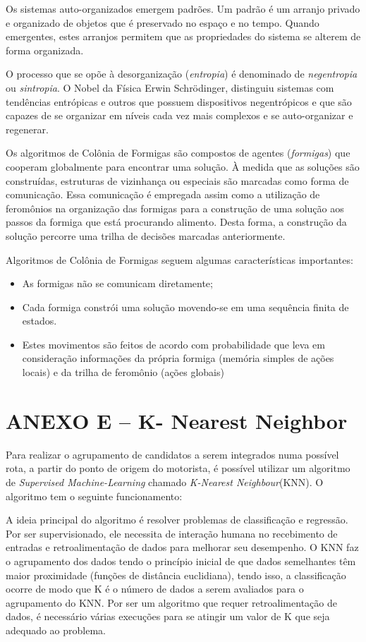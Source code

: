 Os sistemas auto-organizados emergem padrões. Um padrão é um arranjo privado e organizado de objetos que é preservado no espaço e no tempo. Quando emergentes, estes arranjos permitem que as propriedades do sistema se alterem de forma organizada.

O processo que se opõe à desorganização (\emph{entropia}) é denominado de \emph{negentropia} ou \emph{sintropia}. O Nobel da Física Erwin Schrödinger, distinguiu sistemas com tendências entrópicas e outros que possuem dispositivos negentrópicos e que são capazes de se organizar em níveis cada vez mais complexos e se auto-organizar e regenerar. 

Os algoritmos de Colônia de Formigas são compostos de agentes (\emph{formigas}) que cooperam globalmente para encontrar uma solução. À medida que as soluções são construídas, estruturas de vizinhança ou especiais são marcadas como forma de comunicação. Essa comunicação é empregada assim como a utilização de feromônios na organização das formigas para a construção de uma solução aos passos da formiga que está procurando alimento. Desta forma, a construção da solução percorre uma trilha de decisões marcadas anteriormente.

Algoritmos de Colônia de Formigas seguem algumas características importantes:
\begin{itemize}
    \item As formigas não se comunicam diretamente;
    \item Cada formiga constrói uma solução movendo-se em uma sequência finita de estados.
    \item Estes movimentos são feitos de acordo com probabilidade que leva em consideração informações da própria formiga (memória simples de ações locais) e da trilha de feromônio (ações globais)
\end{itemize}

\chapter*{ANEXO E -- K- Nearest Neighbor}
\label{anexo-k-nearest}
Para realizar o agrupamento de candidatos a serem integrados numa possível rota, a partir do ponto de origem do motorista, é possível utilizar um algoritmo de \emph{ Supervised Machine-Learning }chamado \emph{K-Nearest Neighbour}(KNN). O algoritmo tem o seguinte funcionamento:

A ideia principal do algoritmo é resolver problemas de classificação e regressão. Por ser supervisionado, ele necessita de interação humana no recebimento de entradas e retroalimentação de dados para melhorar seu desempenho. O KNN faz o agrupamento dos dados tendo o princípio inicial de que dados semelhantes têm maior proximidade (funções de distância euclidiana), tendo isso, a classificação ocorre de modo que K é o número de dados a serem avaliados para o agrupamento do KNN. Por ser um algoritmo que requer retroalimentação de dados, é necessário várias execuções para se atingir um valor de K que seja adequado ao problema.

